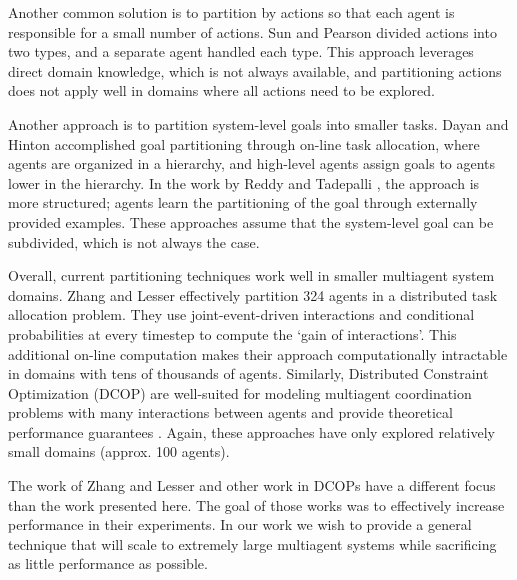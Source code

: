 \documentclass[smallcondensed]{svjour3}
\begin{document}
Another common solution is to partition by actions so that each agent is responsible for a small number of actions. Sun and Pearson \cite{Sun98someexperiments} divided actions into two types, and a separate agent handled each type. This approach leverages direct domain knowledge, which is not always available, and partitioning actions does not apply well in domains where all actions need to be explored.

Another approach is to partition system-level goals into smaller tasks. Dayan and Hinton \cite{Dayan93feudalreinforcement} accomplished goal partitioning through on-line task allocation, where agents are organized in a hierarchy, and high-level agents assign goals to agents lower in the hierarchy. In the work by Reddy and Tadepalli \cite{Reddy_learninggoal-decomposition}, the approach is more structured; agents learn the partitioning of the goal through externally provided examples. These approaches assume that the system-level goal can be subdivided, which is not always the case. 

Overall, current partitioning techniques work well in smaller multiagent system domains. Zhang and Lesser \cite{Zhang:2010:SCD:1838206.1838304} effectively partition 324 agents in a distributed task allocation problem. They use joint-event-driven interactions and conditional probabilities at every timestep to compute the `gain of interactions'. This additional on-line computation makes their approach computationally intractable in domains with tens of thousands of agents. Similarly, Distributed Constraint Optimization (DCOP) are well-suited for modeling multiagent coordination problems with many interactions between agents and provide theoretical performance guarantees \cite{Junges:2008:EPD:1402298.1402308,Modi:2005:AAD:1120120.1120127}. Again, these approaches have only explored relatively small domains (approx. 100 agents).

The work of Zhang and Lesser \cite{Zhang:2010:SCD:1838206.1838304} and other work in DCOPs \cite{Junges:2008:EPD:1402298.1402308,Modi:2005:AAD:1120120.1120127} have a different focus than the work presented here. The goal of those works was to effectively increase performance in their experiments. In our work we wish to provide a general technique that will scale to extremely large multiagent systems while sacrificing as little performance as possible.

\end{document}
